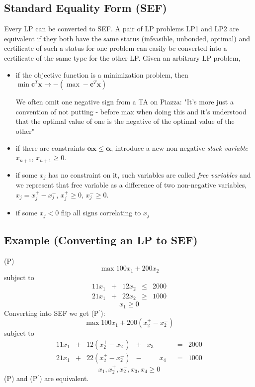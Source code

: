 \subsection{Standard Equality Form (SEF)}
Every LP can be converted to SEF. A pair of LP problems LP1 and LP2 are equivalent if they both have the
same status (infeasible, unbonded, optimal) and certificate of such a status for one problem can easily
be converted into a certificate of the same type for the other LP.
Given an arbitrary LP problem, 
\begin{itemize}
    \item if the objective function is a minimization problem, then 
    $\min \mathbf{c}^T\mathbf{x}\rightarrow -(\max -\mathbf{c}^T\mathbf{x})$
        \begin{remark}
        We often omit one negative sign
        from a TA on Piazza: "It's more just a convention of not putting - 
        before max when doing this and it's understood that the 
        optimal value of one is the negative of the optimal value of the other"
        \end{remark} 
    \item if there are constraints $\mathbf{\alpha}\mathbf{x}\le \mathbf{\alpha}$, introduce a new
    non-negative \emph{slack variable} $x_{n+1}$, $x_{n+1}\ge 0$.
    \item if some $x_j$ has no constraint on it, such variables are called \emph{free variables} and
    we represent that free variable as a difference of two non-negative variables,
    $x_j=x_j^+-x_j^-$, $x_j^+\ge 0$, $x_j^-\ge 0$.
    \item if some $x_j<0$ flip all signs correlating to $x_j$
\end{itemize}

\subsection{Example (Converting an LP to SEF)}
(P)
\[\max 100x_1+200x_2\]
subject to
\[
\begin{array}{ccccc}
    11x_1 & + & 12x_2 & \le & 2000\\
    21x_1 & + & 22x_2 & \ge & 1000
\end{array}
\]
\[x_1 \ge 0\]
Converting into SEF we get (P$^\prime$):
\[\max 100x_1+200(x_2^+-x_2^-)\]
subject to
\[
\begin{array}{ccccccccc}
    11x_1 & + & 12(x_2^+-x_2^-) & + & x_3 & & & = & 2000\\
    21x_1 & + & 22(x_2^+-x_2^-) & - & & x_4 & & = & 1000
\end{array}
\]
\[x_1,x_2^+,x_2^-,x_3,x_4\ge 0\]
(P) and (P$^\prime$) are equivalent.


